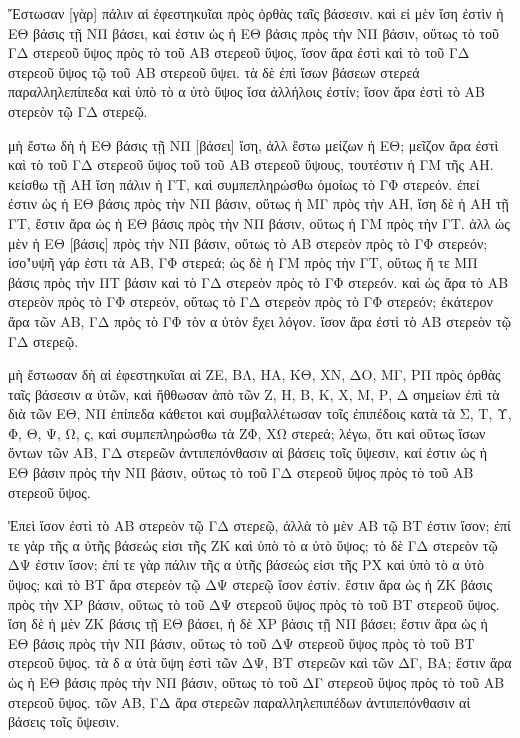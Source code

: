 \begin{Parallel}{}{}
{{\greekfont Ἔστωσαν [γὰρ] πάλιν αἱ ἐφεστηκυῖαι πρὸς ὀρθὰς ταῖς βάσεσιν.
καὶ εἰ μὲν ἴση ἐστὶν ἡ ΕΘ βάσις τῇ ΝΠ βάσει, καί ἐστιν ὡς ἡ ΕΘ
βάσις πρὸς τὴν ΝΠ βάσιν, οὕτως τὸ τοῦ ΓΔ στερεοῦ ὕψος πρὸς
τὸ τοῦ ΑΒ στερεοῦ ὕψος, ἴσον ἄρα ἐστὶ καὶ τὸ τοῦ ΓΔ στερεοῦ
ὕψος τῷ τοῦ ΑΒ στερεοῦ ὕψει. τὰ δὲ ἐπὶ ἴσων βάσεων στερεά
παραλληλεπίπεδα καὶ ὑπὸ τὸ α ὐτὸ ὕψος ἴσα ἀλλήλοις ἐστίν;
ἴσον ἄρα ἐστὶ τὸ ΑΒ στερεὸν τῷ
ΓΔ στερεῷ.}

{\greekfont μὴ ἔστω δὴ ἡ ΕΘ βάσις τῇ ΝΠ [βάσει] ἴση, ἀλλ ἔστω μείζων
ἡ ΕΘ; μεῖζον ἄρα ἐστὶ καὶ τὸ τοῦ ΓΔ στερεοῦ ὕψος τοῦ
τοῦ ΑΒ στερεοῦ ὕψους, τουτέστιν ἡ ΓΜ τῆς ΑΗ. κείσθω τῇ
ΑΗ ἴση πάλιν ἡ ΓΤ, καὶ συμπεπληρώσθω ὁμοίως τὸ ΓΦ στερεόν.
ἐπεί ἐστιν ὡς ἡ ΕΘ βάσις πρὸς τὴν ΝΠ βάσιν, οὕτως
ἡ ΜΓ πρὸς τὴν ΑΗ, ἴση δὲ ἡ ΑΗ τῇ ΓΤ, ἔστιν ἄρα ὡς ἡ ΕΘ
βάσις πρὸς τὴν ΝΠ βάσιν, οὕτως ἡ ΓΜ πρὸς τὴν ΓΤ. ἀλλ
ὡς μὲν ἡ ΕΘ [βάσις] πρὸς τὴν ΝΠ βάσιν, οὕτως τὸ ΑΒ
στερεὸν πρὸς τὸ ΓΦ στερεόν; ἰσο"υψῆ γάρ ἐστι τὰ ΑΒ, ΓΦ στερεά;
ὡς δὲ ἡ ΓΜ πρὸς τὴν ΓΤ, οὕτως ἥ τε ΜΠ βάσις πρὸς τὴν ΠΤ
βάσιν καὶ τὸ ΓΔ στερεὸν πρὸς τὸ ΓΦ στερεόν. καὶ ὡς ἄρα τὸ ΑΒ
στερεὸν πρὸς τὸ ΓΦ στερεόν, οὕτως τὸ ΓΔ στερεὸν πρὸς τὸ ΓΦ
στερεόν; ἑκάτερον ἄρα τῶν ΑΒ, ΓΔ πρὸς τὸ ΓΦ τὸν α ὐτὸν
ἔχει λόγον. ἴσον ἄρα ἐστὶ τὸ ΑΒ στερεὸν τῷ ΓΔ στερεῷ.}

\epsfysize=3in
\centerline{}

{\greekfont μὴ ἔστωσαν δὴ αἱ ἐφεστηκυῖαι αἱ ΖΕ, ΒΛ, ΗΑ, ΚΘ, ΧΝ, ΔΟ, ΜΓ, ΡΠ
πρὸς ὀρθὰς ταῖς βάσεσιν α ὐτῶν, καὶ ἤθθωσαν ἀπὸ τῶν Ζ,
Η, Β, Κ, Χ, Μ, Ρ, Δ σημείων ἐπὶ τὰ διὰ τῶν ΕΘ, ΝΠ ἐπίπεδα
κάθετοι καὶ συμβαλλέτωσαν τοῖς ἐπιπέδοις κατὰ τὰ Σ, Τ, Υ, Φ,
Θ, Ψ, Ω, ς, καὶ συμπεπληρώσθω τὰ ΖΦ, ΧΩ στερεά; λέγω, ὅτι καὶ
οὕτως ἴσων ὄντων τῶν ΑΒ, ΓΔ στερεῶν ἀντιπεπόνθασιν
αἱ βάσεις τοῖς ὕψεσιν, καί ἐστιν ὡς ἡ ΕΘ βἁσιν πρὸς τὴν ΝΠ
βάσιν, οὕτως τὸ τοῦ ΓΔ στερεοῦ ὕψος πρὸς τὸ τοῦ ΑΒ στερεοῦ
ὕψος.}

{\greekfont Ἐπεὶ ἴσον ἐστὶ τὸ ΑΒ στερεὸν τῷ ΓΔ στερεῷ, ἀλλὰ τὸ μὲν ΑΒ τῷ ΒΤ ἐστιν ἴσον; ἐπί τε γὰρ τῆς α ὐτῆς βάσεώς εἰσι τῆς
ΖΚ καὶ ὑπὸ τὸ α ὐτὸ ὕψος;
τὸ δὲ ΓΔ στερεὸν τῷ ΔΨ ἐστιν ἴσον; ἐπί τε γὰρ πάλιν τῆς
α ὐτῆς βάσεώς εἰσι τῆς ΡΧ καὶ ὑπὸ τὸ α ὐτὸ
ὕψος;
καὶ τὸ ΒΤ ἄρα στερεὸν τῷ ΔΨ στερεῷ ἴσον ἐστίν.
ἔστιν ἄρα ὡς ἡ ΖΚ βάσις πρὸς τὴν ΧΡ βάσιν, οὕτως τὸ τοῦ
ΔΨ στερεοῦ ὕψος πρὸς τὸ τοῦ ΒΤ στερεοῦ ὕψος. ἴση
δὲ ἡ μὲν ΖΚ βάσις τῇ ΕΘ βάσει, ἡ δὲ ΧΡ βάσις τῇ ΝΠ βάσει; ἔστιν
ἄρα ὡς ἡ ΕΘ βάσις πρὸς τὴν ΝΠ βάσιν, οὕτως τὸ τοῦ ΔΨ στερεοῦ
ὕψος πρὸς τὸ τοῦ ΒΤ στερεοῦ ὕψος. τὰ δ α ὐτὰ ὕψη ἐστὶ τῶν
ΔΨ, ΒΤ στερεῶν καὶ τῶν ΔΓ, ΒΑ; ἔστιν ἄρα ὡς ἡ ΕΘ βάσις πρὸς
τὴν ΝΠ βάσιν, οὕτως τὸ τοῦ ΔΓ στερεοῦ ὕψος πρὸς τὸ τοῦ
ΑΒ στερεοῦ ὕψος. τῶν ΑΒ, ΓΔ ἄρα στερεῶν παραλληλεπιπέδων
ἀντιπεπόνθασιν αἱ βάσεις τοῖς ὕψεσιν.}

}
\end{Parallel}
